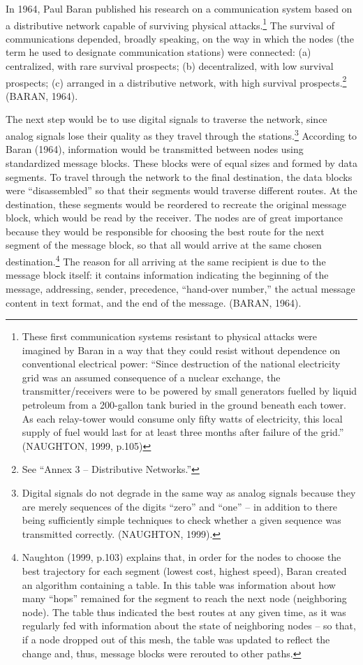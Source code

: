In 1964, Paul Baran published his research on a communication system based on a distributive network capable of surviving physical attacks.\footnote{These first communication systems resistant to physical attacks were imagined by Baran in a way that they could resist without dependence on conventional electrical power: ``Since destruction of the national electricity grid was an assumed consequence of a nuclear exchange, the transmitter/receivers were to be powered by small generators fuelled by liquid petroleum from a 200-gallon tank buried in the ground beneath each tower. As each relay-tower would consume only fifty watts of electricity, this local supply of fuel would last for at least three months after failure of the grid.'' (NAUGHTON, 1999, p.105)} The survival of communications depended, broadly speaking, on the way in which the nodes (the term he used to designate communication stations) were connected: (a) centralized, with rare survival prospects; (b) decentralized, with low survival prospects; (c) arranged in a distributive network, with high survival prospects.\footnote{See ``Annex 3 -- Distributive Networks.''} (BARAN, 1964).

The next step would be to use digital signals to traverse the network, since analog signals lose their quality as they travel through the stations.\footnote{Digital signals do not degrade in the same way as analog signals because they are merely sequences of the digits ``zero'' and ``one'' -- in addition to there being sufficiently simple techniques to check whether a given sequence was transmitted correctly. (NAUGHTON, 1999).} According to Baran (1964), information would be transmitted between nodes using standardized message blocks. These blocks were of equal sizes and formed by data segments. To travel through the network to the final destination, the data blocks were ``disassembled'' so that their segments would traverse different routes. At the destination, these segments would be reordered to recreate the original message block, which would be read by the receiver. The nodes are of great importance because they would be responsible for choosing the best route for the next segment of the message block, so that all would arrive at the same chosen destination.\footnote{Naughton (1999, p.103) explains that, in order for the nodes to choose the best trajectory for each segment (lowest cost, highest speed), Baran created an algorithm containing a table. In this table was information about how many ``hops'' remained for the segment to reach the next node (neighboring node). The table thus indicated the best routes at any given time, as it was regularly fed with information about the state of neighboring nodes -- so that, if a node dropped out of this mesh, the table was updated to reflect the change and, thus, message blocks were rerouted to other paths.} The reason for all arriving at the same recipient is due to the message block itself: it contains information indicating the beginning of the message, addressing, sender, precedence, ``hand-over number,'' the actual message content in text format, and the end of the message. (BARAN, 1964).


